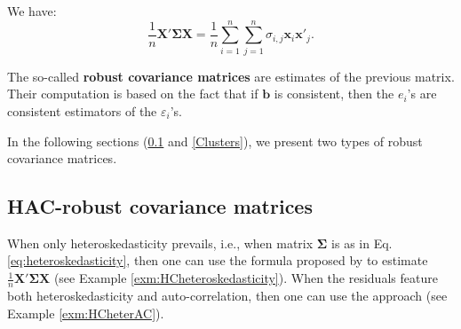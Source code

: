 \documentclass[
  12pt,
]{book}
\theoremstyle{definition}
\theoremstyle{definition}
\theoremstyle{definition}
\theoremstyle{definition}
\theoremstyle{remark}
\begin{document}
We have:
\begin{equation}
\frac{1}{n}\mathbf{X}'\boldsymbol\Sigma\mathbf{X} = \frac{1}{n}\sum_{i=1}^{n}\sum_{j=1}^{n}\sigma_{i,j}\mathbf{x}_i\mathbf{x}'_j. \label{eq:GeneralXSigmaX}
\end{equation}

The so-called \textbf{robust covariance matrices} are estimates of the previous matrix. Their computation is based on the fact that if \(\mathbf{b}\) is consistent, then the \(e_i\)'s are consistent estimators of the \(\varepsilon_i\)'s.

In the following sections (\ref{HAC} and \ref{Clusters}), we present two types of robust covariance matrices.

\hypertarget{HAC}{%
\subsection{HAC-robust covariance matrices}\label{HAC}}

When only heteroskedasticity prevails, i.e., when matrix \(\boldsymbol\Sigma\) is as in Eq. \eqref{eq:heteroskedasticity}, then one can use the formula proposed by \citet{White_1980} to estimate \(\frac{1}{n}\mathbf{X}'\boldsymbol\Sigma\mathbf{X}\) (see Example \ref{exm:HCheteroskedasticity}). When the residuals feature both heteroskedasticity and auto-correlation, then one can use the \citet{Newey_West_1987} approach (see Example \ref{exm:HCheterAC}).
\end{document}
